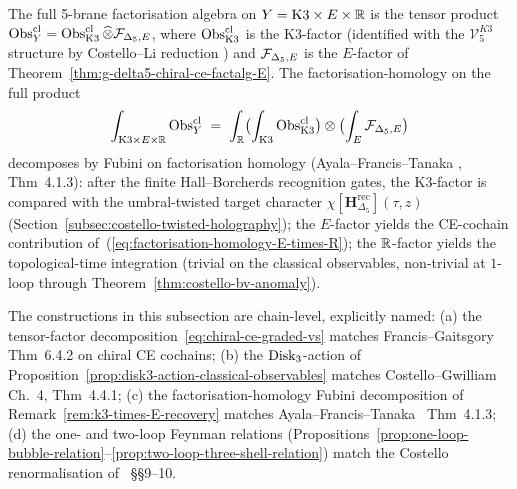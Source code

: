 \begin{remark}
\label{rem:k3-times-E-recovery}
The full 5-brane factorisation algebra on $Y = \mathrm{K3}\times
E\times\mathbb R$ is the tensor product
$\mathrm{Obs}^{\mathrm{cl}}_Y = \operatorname{Obs}^{\mathrm{cl}}_{\mathrm{K3}}
\widehat\otimes \mathcal F_{\Delta_5,E}$, where $\operatorname{Obs}^{\mathrm{cl}}_{\mathrm{K3}}$ is
the K3-factor (identified with the $\mathcal V^{K3}_5$ structure by
Costello--Li reduction \cite{CL16}) and $\mathcal F_{\Delta_5,E}$ is the
$E$-factor of Theorem~\ref{thm:g-delta5-chiral-ce-factalg-E}. The
factorisation-homology on the full product
\begin{equation}
\int_{\mathrm{K3}\times E\times\mathbb R}\operatorname{Obs}^{\mathrm{cl}}_Y
\;=\;
\int_\mathbb R\bigl(
\int_{\mathrm{K3}}\operatorname{Obs}^{\mathrm{cl}}_{\mathrm{K3}}\bigr)
\otimes\bigl(\int_E\mathcal F_{\Delta_5,E}\bigr)
\end{equation}
decomposes by Fubini on factorisation homology (Ayala--Francis--Tanaka
\cite{AyalaFrancisTanaka2017}, Thm~4.1.3): after the finite
Hall--Borcherds recognition gates, the K3-factor is compared with the
umbral-twisted target character
$\chi[\mathbf H_{\Delta_5}^{\mathrm{rec}}](\tau,z)$
(Section~\ref{subsec:costello-twisted-holography}); the $E$-factor
yields the CE-cochain contribution of~(\ref{eq:factorisation-homology-E-times-R});
the $\mathbb R$-factor yields the topological-time integration (trivial on
the classical observables, non-trivial at $1$-loop through
Theorem~\ref{thm:costello-bv-anomaly}).
\end{remark}

\begin{remark}
\label{rem:e3-chiral-ce-primary-lit}
The constructions in this subsection are chain-level, explicitly named:
(a) the tensor-factor decomposition~\eqref{eq:chiral-ce-graded-vs}
matches Francis--Gaitsgory~\cite{FrancisGaitsgory2012}
Thm~6.4.2 on chiral CE cochains;
(b) the $\mathrm{Disk}_3$-action of
Proposition~\ref{prop:disk3-action-classical-observables}
matches Costello--Gwilliam~\cite{CG17} Ch.~4, Thm~4.4.1;
(c) the factorisation-homology Fubini decomposition of
Remark~\ref{rem:k3-times-E-recovery}
matches Ayala--Francis--Tanaka~\cite{AyalaFrancisTanaka2017} Thm~4.1.3;
(d) the one- and two-loop Feynman relations
(Propositions~\ref{prop:one-loop-bubble-relation}--\ref{prop:two-loop-three-shell-relation})
match the Costello renormalisation
of~\cite{costello-renormalization} \S\S9--10.
\end{remark}


